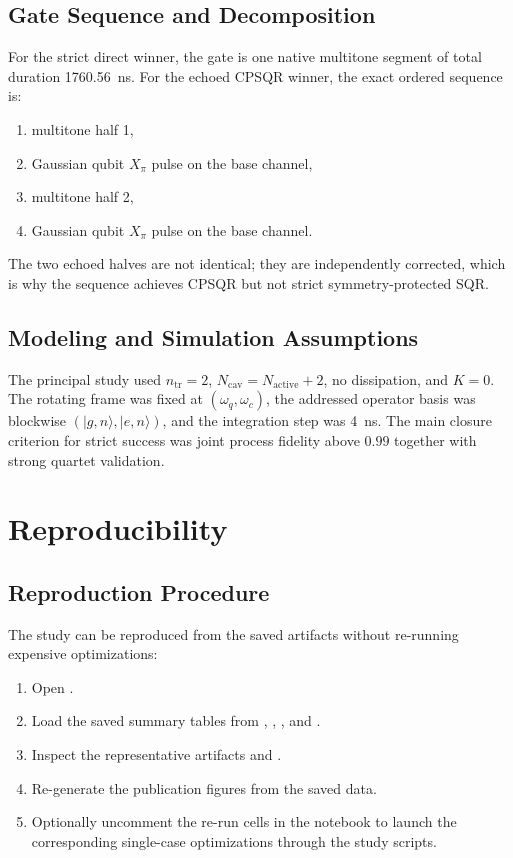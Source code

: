 \documentclass[aps,pra,twocolumn,reprint,floatfix,amsmath,amssymb]{revtex4-2}
\begin{document}
\subsection{Gate Sequence and Decomposition}
For the strict direct winner, the gate is one native multitone segment of total duration \SI{1760.56}{ns}. For the echoed CPSQR winner, the exact ordered sequence is:
\begin{enumerate}
    \item multitone half 1,
    \item Gaussian qubit $X_\pi$ pulse on the base channel,
    \item multitone half 2,
    \item Gaussian qubit $X_\pi$ pulse on the base channel.
\end{enumerate}
The two echoed halves are not identical; they are independently corrected, which is why the sequence achieves CPSQR but not strict symmetry-protected SQR.

\subsection{Modeling and Simulation Assumptions}
The principal study used $n_{\mathrm{tr}}=2$, $N_{\mathrm{cav}}=N_{\mathrm{active}}+2$, no dissipation, and $K=0$. The rotating frame was fixed at $(\omega_q,\omega_c)$, the addressed operator basis was blockwise $(|g,n\rangle,|e,n\rangle)$, and the integration step was \SI{4}{ns}. The main closure criterion for strict success was joint process fidelity above $0.99$ together with strong quartet validation.

\section{Reproducibility}

\subsection{Reproduction Procedure}
The study can be reproduced from the saved artifacts without re-running expensive optimizations:
\begin{enumerate}
    \item Open .
    \item Load the saved summary tables from , , , and .
    \item Inspect the representative artifacts  and .
    \item Re-generate the publication figures from the saved data.
    \item Optionally uncomment the re-run cells in the notebook to launch the corresponding single-case optimizations through the study scripts.
\end{enumerate}
\end{document}
